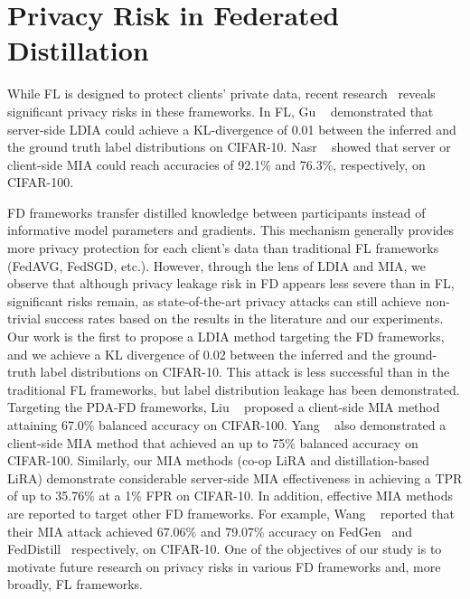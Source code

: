 \section{Privacy Risk in Federated Distillation}
\label{sec:assessement}
While FL is designed to protect clients' private data, recent research~\cite{gu2023ldia,nasr2019comprehensive, liu2023mia,yang2022fd,wang2024graddiff} reveals significant privacy risks in these frameworks. 
In FL, Gu \etal~\cite{gu2023ldia} demonstrated that server-side LDIA could achieve a KL-divergence of 0.01 between the inferred and the ground truth label distributions on CIFAR-10. 
Nasr \etal~\cite{nasr2019comprehensive} showed that server or client-side MIA could reach accuracies of 92.1\% and 76.3\%, respectively, on CIFAR-100.

FD frameworks transfer distilled knowledge between participants instead of informative model parameters and gradients. This mechanism generally provides more privacy protection for each client's data than traditional FL frameworks (FedAVG, FedSGD, etc.).
However, through the lens of LDIA and MIA, we observe that although privacy leakage risk in FD appears less severe than in FL, significant risks remain, as state-of-the-art privacy attacks can still achieve non-trivial success rates based on the results in the literature and our experiments. 
Our work is the first to propose a LDIA method targeting the FD frameworks, and we achieve a KL divergence of 0.02 between the inferred and the ground-truth label distributions on CIFAR-10. This attack is less successful than in the traditional FL frameworks, but label distribution leakage has been demonstrated.
Targeting the PDA-FD frameworks,
Liu \etal~\cite{liu2023mia} proposed a client-side MIA method attaining 67.0\% balanced accuracy on CIFAR-100. 
Yang \etal~\cite{yang2022fd} also demonstrated a client-side MIA method that achieved an up to 75\% balanced accuracy on CIFAR-100.
Similarly, our MIA methods (co-op LiRA and distillation-based LiRA) demonstrate considerable server-side MIA effectiveness in achieving a TPR of up to 35.76\% at a 1\% FPR on CIFAR-10. 
In addition, effective MIA methods are reported to target other FD frameworks. 
For example, Wang \etal~\cite{wang2024graddiff} reported that their MIA attack achieved 67.06\% and 79.07\% accuracy on FedGen~\cite{zhu2021data} and FedDistill~\cite{jiang2020federated} respectively, on CIFAR-10.
One of the objectives of our study is to motivate future research on privacy risks in various FD frameworks and, more broadly, FL frameworks.

